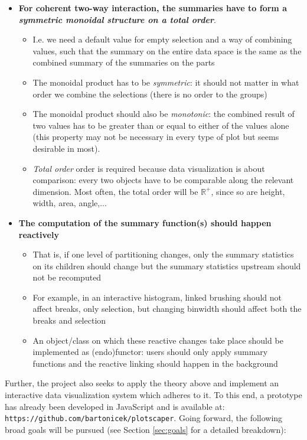 \documentclass[12pt,a4paper]{article}
\begin{document}
\begin{itemize}
\item \textbf{For coherent two-way interaction, the summaries have to form a \textit{symmetric monoidal structure on a total order}}.

  \begin{itemize}
  
  \item I.e. we need a default value for empty selection and a way of combining values, such that the summary on the entire data space is the same as the combined summary of the summaries on the parts
  \item The monoidal product has to be \textit{symmetric}: it should not matter in what order we combine the selections (there is no order to the groups) 
  \item The monoidal product should also be \textit{monotonic}: the combined result of two values has to be greater than or equal to either of the values alone (this property may not be necessary in every type of plot but seems desirable in most).
  \item \textit{Total order} order is required because data visualization is about comparison: every two objects have to be comparable along the relevant dimension. Most often, the total order will be $\mathbb{R}^+$, since so are height, width, area, angle,... 
  \end{itemize}
  
\item \textbf{The computation of the summary function(s) should happen reactively}
  \begin{itemize}
  \item That is, if one level of partitioning changes, only the summary statistics on its children should change but the summary statistics upstream should not be recomputed
  \item For example, in an interactive histogram, linked brushing should not affect breaks, only selection, but changing binwidth should affect both the breaks and selection 
  \item An object/class on which these reactive changes take place should be implemented as (endo)functor: users should only apply summary functions and the reactive linking should happen in the background  
  \end{itemize}

\end{itemize}



Further, the project also seeks to apply the theory above and implement an interactive data visualization system which adheres to it. To this end, a prototype has already been developed in JavaScript and is available at: \texttt{https://github.com/bartonicek/plotscaper}. Going forward, the following broad goals will be pursued (see Section \ref{sec:goals} for a detailed breakdown):  
\end{document}
